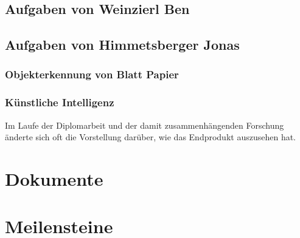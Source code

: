 \subsection{Aufgaben von Weinzierl Ben}

\subsection{Aufgaben von Himmetsberger Jonas}
\subsubsection{Objekterkennung von Blatt Papier}
\subsubsection{Künstliche Intelligenz}
Im Laufe der Diplomarbeit und der damit zusammenhängenden Forschung änderte sich oft die
Vorstellung darüber, wie das Endprodukt auszusehen hat.


\section{Dokumente}
\section{Meilensteine}
